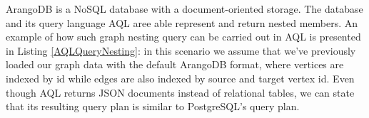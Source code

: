 ArangoDB is a NoSQL database with a document-oriented storage. The database and its query language AQL aree able represent and return nested members. An example of how such graph nesting query can be carried out in AQL is presented in Listing \ref{AQLQueryNesting}: in this scenario we assume that we've previously loaded our graph data with the default ArangoDB format, where  vertices are indexed by id while edges are also indexed by source and target vertex id. Even though AQL returns JSON documents instead of relational tables, we can state that its resulting query plan is similar to PostgreSQL's query plan.
%
%
%
%
%
%
%
